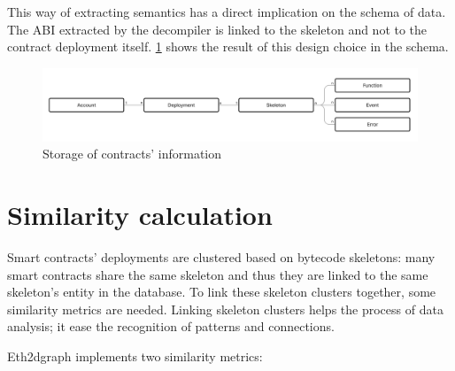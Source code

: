 This way of extracting semantics has a direct implication on the schema of data. The ABI extracted by the decompiler is linked to the skeleton and not to the contract deployment itself. \cref{fig:contracts-storage} shows the result of this design choice in the schema.

\begin{figure}[H]
  \centering
  \includegraphics[width=1\textwidth]{Figures/methods/contracts-storage.jpg}
  \caption[Storage of contracts' information]{Storage of contracts' information}
  \label{fig:contracts-storage}
\end{figure}

\section{Similarity calculation}

Smart contracts' deployments are clustered based on bytecode skeletons: many smart contracts share the same skeleton and thus they are linked to the same skeleton's entity in the database. To link these skeleton clusters together, some similarity metrics are needed. Linking skeleton clusters helps the process of data analysis; it ease the recognition of patterns and connections.

Eth2dgraph implements two similarity metrics:


